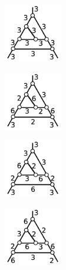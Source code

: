 \documentclass[suppldata, dvipdfmx]{interact}
\theoremstyle{plain}%
\theoremstyle{definition}
\theoremstyle{remark}
\theoremstyle{problemstyle}
\begin{document}
\begin{figure}[h!tbp]
 \begin{minipage}[t]{0.23\textwidth}
   \centering
   \includegraphics[width=1in,
   keepaspectratio]{./img/HexahedraWithSphericalFaces/hexahedralCake1/a.jpg}
   \subcaption{}
   \label{fig:cake1a}
  \end{minipage}
  \hspace*{\fill}
  \begin{minipage}[t]{0.23\textwidth}
   \centering
   \includegraphics[width=1in, keepaspectratio]{./img/HexahedraWithSphericalFaces/hexahedralCake1/b.jpg}
   \subcaption{}
   \label{fig:cake1b}
  \end{minipage}
 \hspace*{\fill}
  \begin{minipage}[t]{0.23\textwidth}
   \centering
   \includegraphics[width=1in, keepaspectratio]{./img/HexahedraWithSphericalFaces/hexahedralCake1/c.jpg}
   \subcaption{}
   \label{fig:cake1c}
  \end{minipage}
 \hspace*{\fill}
  \begin{minipage}[t]{0.23\textwidth}
   \centering
   \includegraphics[width=1in, keepaspectratio]{./img/HexahedraWithSphericalFaces/hexahedralCake1/d.jpg}
   \subcaption{}
   \label{fig:cake1d}
  \end{minipage}

\end{figure}
\end{document}
